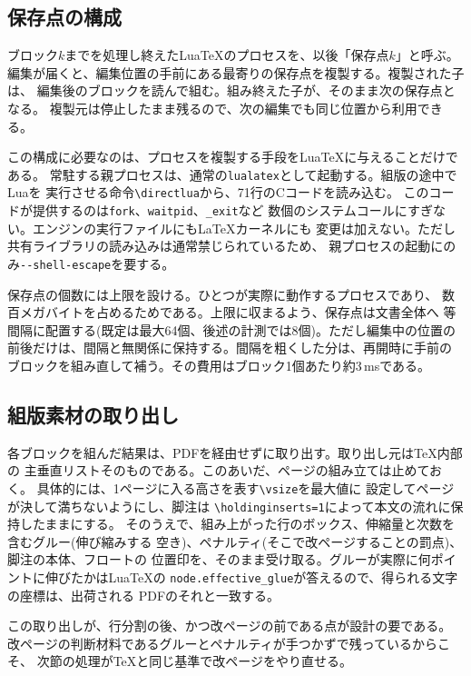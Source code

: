 \documentclass[a4paper,11pt]{ltjsarticle}
\newcommand{\code}[1]{\texttt{#1}}
\begin{document}
\subsection{保存点の構成}

ブロック$k$までを処理し終えたLuaTeXのプロセスを、以後「保存点$k$」と呼ぶ。
編集が届くと、編集位置の手前にある最寄りの保存点を複製する。複製された子は、
編集後のブロックを読んで組む。組み終えた子が、そのまま次の保存点となる。
複製元は停止したまま残るので、次の編集でも同じ位置から利用できる。

この構成に必要なのは、プロセスを複製する手段をLuaTeXに与えることだけである。
常駐する親プロセスは、通常の\code{lualatex}として起動する。組版の途中でLuaを
実行させる命令\code{\textbackslash directlua}から、71行のCコードを読み込む。
このコードが提供するのは\code{fork}、\code{waitpid}、\code{\_exit}など
数個のシステムコールにすぎない。エンジンの実行ファイルにも\LaTeX{}カーネルにも
変更は加えない。ただし共有ライブラリの読み込みは通常禁じられているため、
親プロセスの起動にのみ\code{-{}-shell-escape}を要する。

保存点の個数には上限を設ける。ひとつが実際に動作するプロセスであり、
数百メガバイトを占めるためである。上限に収まるよう、保存点は文書全体へ
等間隔に配置する(既定は最大64個、後述の計測では8個)。ただし編集中の位置の
前後だけは、間隔と無関係に保持する。間隔を粗くした分は、再開時に手前の
ブロックを組み直して補う。その費用はブロック1個あたり約3\,msである。

\subsection{組版素材の取り出し}

各ブロックを組んだ結果は、PDFを経由せずに取り出す。取り出し元は\TeX{}内部の
主垂直リストそのものである。このあいだ、ページの組み立ては止めておく。
具体的には、1ページに入る高さを表す\code{\textbackslash vsize}を最大値に
設定してページが決して満ちないようにし、脚注は
\code{\textbackslash holdinginserts=1}によって本文の流れに保持したままにする。
そのうえで、組み上がった行のボックス、伸縮量と次数を含むグルー(伸び縮みする
空き)、ペナルティ(そこで改ページすることの罰点)、脚注の本体、フロートの
位置印を、そのまま受け取る。グルーが実際に何ポイントに伸びたかはLuaTeXの
\code{node.effective\_glue}が答えるので、得られる文字の座標は、出荷される
PDFのそれと一致する。

この取り出しが、行分割の後、かつ改ページの前である点が設計の要である。
改ページの判断材料であるグルーとペナルティが手つかずで残っているからこそ、
次節の処理が\TeX{}と同じ基準で改ページをやり直せる。
\end{document}
